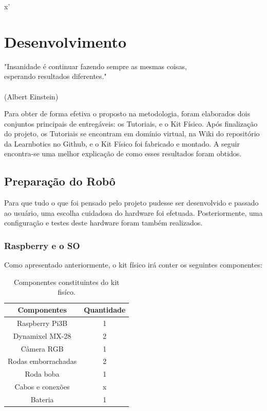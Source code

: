 x'\chapter{Desenvolvimento}
\label{chap:desen_test}
\begin{flushright}
	"Insanidade é continuar fazendo sempre as mesmas coisas, \\ 
	esperando resultados diferentes." \\
	\ \\
	(Albert Einstein)
\end{flushright}

Para obter de forma efetiva o proposto na metodologia, foram elaborados dois conjuntos principais de entregáveis: os Tutoriais, e o Kit Físico. Após finalização do projeto, os Tutoriais se encontram em domínio virtual, na Wiki do repositório da Learnbotics no Github, e o Kit Físico foi fabricado e montado. A seguir encontra-se uma melhor explicação de como esses resultados foram obtidos.

\section{Preparação do Robô}
Para que tudo o que foi pensado pelo projeto pudesse ser desenvolvido e passado ao usuário, uma escolha cuidadosa do hardware foi efetuada. Posteriormente, uma configuração e testes deste hardware foram também realizados.

\subsection{Raspberry e o SO}

Como apresentado anteriormente, o kit físico irá conter os seguintes componentes:
\begin{table}
	\centering
	\begin{small}
		\caption{Componentes constituintes do kit fisíco.} \label{Tabela1}
		\begin{tabular}{cc}
			\hline
			Componentes              & Quantidade\\
			\hline
			Raspberry Pi3B              & 1 \\
			Dynamixel MX-28			    & 2 \\
			Câmera RGB		            & 1 \\
			Rodas emborrachadas		    & 2 \\
			Roda boba		            & 1 \\
			Cabos e conexões            & x \\
			Bateria 			        & 1 \\
			\hline
		\end{tabular}
	\end{small}
\end{table}

